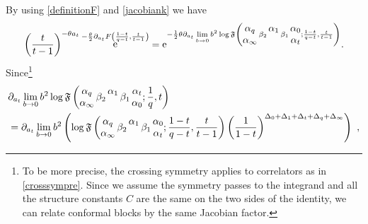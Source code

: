 \documentclass[11pt]{article}
\numberwithin{equation}{section}
\newcommand{\be}{\begin{equation}}
\newcommand{\ee}{\end{equation}}
\newcommand{\E}{{\mathrm e}}
\DeclareMathOperator{\re}{{\rm e}}
\begin{document}
By using \eqref{definitionF} and \eqref{jacobiank} we have
\begin{equation}
    \left(\frac{t}{t-1}\right)^{-\theta a_{t} }\re^{-\frac{\theta}{2}\partial_{a_t}F\left({1-t\over q-t},\frac{t}{t-1}\right)}
    =\E^{-\frac1 2\theta\partial_{a_t}\lim\limits_{b\rightarrow 0}b^2\log\mathfrak{F}\left(\begin{matrix}\alpha_q\\ \alpha_{\infty}\end{matrix}\,\beta_2\,\begin{matrix}\alpha_1\\ {}\end{matrix}\,\beta_1\,\begin{matrix}\alpha_0\\ \alpha_{t}\end{matrix};{1-t\over q-t},\frac{t}{t-1}\right)}.
\end{equation}
Since\footnote{To be more precise, the crossing symmetry applies to correlators as in \eqref{crosssympre}. Since we assume the symmetry passes to the integrand and all the structure constants $C$ are the same on the two sides of the identity, we can relate conformal blocks by the same Jacobian factor.}
\begin{align}
&\partial_{a_t}\lim\limits_{b\rightarrow 0}b^2\log\mathfrak{F}\left(\begin{matrix}\alpha_q\\ \alpha_{\infty}\end{matrix}\,\beta_2\,\begin{matrix}\alpha_1\\ {}\end{matrix}\,\beta_1\,\begin{matrix}\alpha_t\\ \alpha_{0}\end{matrix};{1\over q},t\right)\\
&=\partial_{a_t}\lim\limits_{b\rightarrow 0}b^2\left(\log\mathfrak{F}\left(\begin{matrix}\alpha_q\\ \alpha_{\infty}\end{matrix}\,\beta_2\,\begin{matrix}\alpha_1\\ {}\end{matrix}\,\beta_1\,\begin{matrix}\alpha_0\\ \alpha_{t}\end{matrix};{1-t\over q-t},\frac{t}{t-1}\right)\left(\frac{1}{1-t}\right)^{\Delta_0+\Delta_1+\Delta_t+\Delta_q+\Delta_\infty}\right)~,
\end{align}
\end{document}
